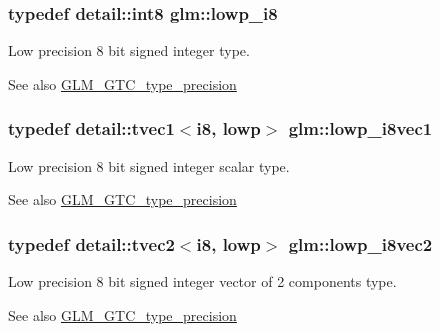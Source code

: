\subsubsection[{\texorpdfstring{lowp\+\_\+i8}{lowp_i8}}]{\setlength{\rightskip}{0pt plus 5cm}typedef detail\+::int8 {\bf glm\+::lowp\+\_\+i8}}\hypertarget{group__gtc__type__precision_gaa2e13ee29c90f75658beed6082541097}{}\label{group__gtc__type__precision_gaa2e13ee29c90f75658beed6082541097}
Low precision 8 bit signed integer type. \begin{DoxySeeAlso}{See also}
\hyperlink{group__gtc__type__precision}{G\+L\+M\+\_\+\+G\+T\+C\+\_\+type\+\_\+precision} 
\end{DoxySeeAlso}
\subsubsection[{\texorpdfstring{lowp\+\_\+i8vec1}{lowp_i8vec1}}]{\setlength{\rightskip}{0pt plus 5cm}typedef detail\+::tvec1$<$i8, lowp$>$ {\bf glm\+::lowp\+\_\+i8vec1}}\hypertarget{group__gtc__type__precision_ga490ff77964d0386c1db936eb2a324988}{}\label{group__gtc__type__precision_ga490ff77964d0386c1db936eb2a324988}
Low precision 8 bit signed integer scalar type. \begin{DoxySeeAlso}{See also}
\hyperlink{group__gtc__type__precision}{G\+L\+M\+\_\+\+G\+T\+C\+\_\+type\+\_\+precision} 
\end{DoxySeeAlso}
\subsubsection[{\texorpdfstring{lowp\+\_\+i8vec2}{lowp_i8vec2}}]{\setlength{\rightskip}{0pt plus 5cm}typedef detail\+::tvec2$<$i8, lowp$>$ {\bf glm\+::lowp\+\_\+i8vec2}}\hypertarget{group__gtc__type__precision_ga511280c8869c7c79bba3c359f37f5559}{}\label{group__gtc__type__precision_ga511280c8869c7c79bba3c359f37f5559}
Low precision 8 bit signed integer vector of 2 components type. \begin{DoxySeeAlso}{See also}
\hyperlink{group__gtc__type__precision}{G\+L\+M\+\_\+\+G\+T\+C\+\_\+type\+\_\+precision} 
\end{DoxySeeAlso}
